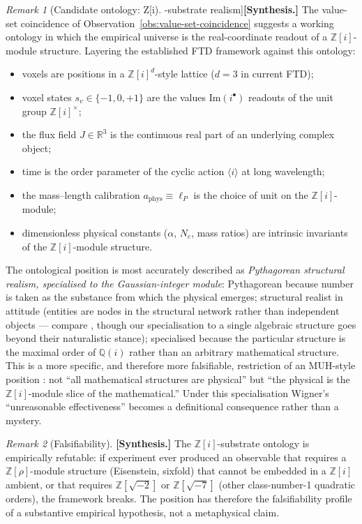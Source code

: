 \documentclass[11pt]{amsart}
\theoremstyle{plain}
\theoremstyle{definition}
\theoremstyle{remark}
\newtheorem*{remark}{Remark}
\newcommand{\Z}{\mathbb{Z}}
\newcommand{\Q}{\mathbb{Q}}
\newcommand{\R}{\mathbb{R}}
\begin{document}
\begin{remark}[Candidate ontology: Z[i]-substrate realism]\label{rem:zi-substrate-realism}
\textbf{[Synthesis.]} The value-set coincidence of
Observation~\ref{obs:value-set-coincidence} suggests a working ontology
in which the empirical universe is the real-coordinate readout of a
$\Z[i]$-module structure. Layering the established FTD framework against
this ontology:
\begin{itemize}[leftmargin=*, itemsep=2pt]
\item voxels are positions in a $\Z[i]^d$-style lattice ($d = 3$ in current FTD);
\item voxel states $s_v \in \{-1, 0, +1\}$ are the values
$\mathrm{Im}(i^{\bullet})$ readouts of the unit group $\Z[i]^\times$;
\item the flux field $J \in \R^3$ is the continuous real part of an
underlying complex object;
\item time is the order parameter of the cyclic action $\langle i \rangle$
at long wavelength;
\item the mass--length calibration $a_{\mathrm{phys}} \equiv \ell_P$ is
the choice of unit on the $\Z[i]$-module;
\item dimensionless physical constants ($\alpha$, $N_c$, mass ratios) are
intrinsic invariants of the $\Z[i]$-module structure.
\end{itemize}
The ontological position is most accurately described as
\emph{Pythagorean structural realism, specialised to the Gaussian-integer
module}: Pythagorean because number is taken as the substance from which
the physical emerges; structural realist in attitude (entities are nodes
in the structural network rather than independent objects --- compare
\cite{ladyman-ross}, though our specialisation to a single algebraic
structure goes beyond their naturalistic stance); specialised because the
particular structure is the maximal order of $\Q(i)$ rather than an
arbitrary mathematical structure. This is a more specific, and therefore
more falsifiable, restriction of an MUH-style position
\cite{tegmark2008}: not ``all mathematical structures are physical'' but
``the physical is the $\Z[i]$-module slice of the mathematical.'' Under
this specialisation Wigner's ``unreasonable effectiveness''
\cite{wigner1960} becomes a definitional consequence rather than a
mystery.
\end{remark}

\begin{remark}[Falsifiability]\label{rem:falsifiability}
\textbf{[Synthesis.]} The $\Z[i]$-substrate ontology is empirically
refutable: if experiment ever produced an observable that requires a
$\Z[\rho]$-module structure (Eisenstein, sixfold) that cannot be
embedded in a $\Z[i]$ ambient, or that requires
$\Z[\sqrt{-2}]$ or $\Z[\sqrt{-7}]$ (other class-number-1 quadratic
orders), the framework breaks. The position has therefore the
falsifiability profile of a substantive empirical hypothesis, not a
metaphysical claim.
\end{remark}
\end{document}
